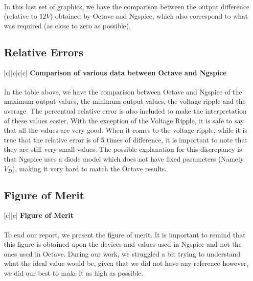 \paragraph{}
In this last set of graphics, we have the comparison between the output difference (relative to $12V$) obtained by Octave and Ngspice, which also correspond to what was required (as close to zero as possible).

\subsection{Relative Errors}
\label{subsec:fourth_topic_error}

\begin{center}
   \begin{tabular}{|c||c|c|c|}
      \hline    
       {\bf Comparison of various data between Octave and Ngspice} \\
      \hline
        
   \end{tabular}
\end{center}

\paragraph{}
In the table above, we have the comparison between Octave and Ngspice of the maximum output values, the minimum output values, the voltage ripple and the average. The percentual relative error is also included to make the interpretation of these values easier.
With the exception of the Voltage Ripple, it is safe to say that all the values are very good. When it comes to the voltage ripple, while it is true that the relative error is of 5 times of difference, it is important to note that they are still very small values. The possible explanation for this discrepancy is that Ngspice uses a diode model which does not have fixed parameters (Namely $V_{D}$), making it very hard to match the Octave results.

\subsection{Figure of Merit}
\label{subsec:Figure_of_Merit}

\begin{center}
   \begin{tabular}{|c||c|}
      \hline    
       {\bf Figure of Merit} \\
      \hline
        
   \end{tabular}
 \end{center}

\paragraph{}
To end our report, we present the figure of merit. It is important to remind that this figure is obtained upon the devices and values used in Ngspice and not the ones used in Octave. During our work, we struggled a bit trying to understand what the ideal value would be, given that we did not have any reference however, we did our best to make it as high as possible.
